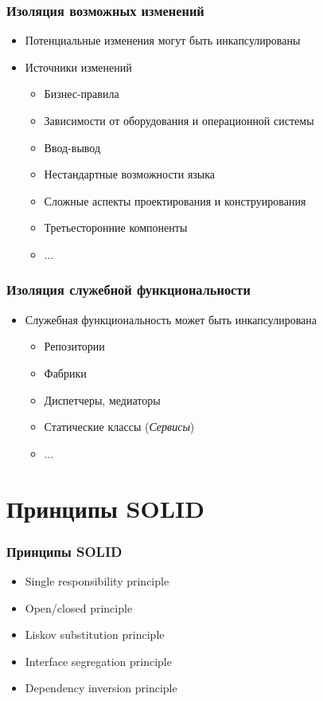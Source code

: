 \documentclass{../cscslides}
\begin{document}
    \begin{frame}
        \frametitle{Изоляция возможных изменений}
        \begin{itemize}
            \item Потенциальные изменения могут быть инкапсулированы
            \item Источники изменений
            \begin{itemize}
                \item Бизнес-правила
                \item Зависимости от оборудования и операционной системы
                \item Ввод-вывод
                \item Нестандартные возможности языка
                \item Сложные аспекты проектирования и конструирования
                \item Третьесторонние компоненты
                \item ...
            \end{itemize}
        \end{itemize}
    \end{frame}

    \begin{frame}
        \frametitle{Изоляция служебной функциональности}
        \begin{itemize}
            \item Служебная функциональность может быть инкапсулирована
            \begin{itemize}
                \item Репозитории
                \item Фабрики
                \item Диспетчеры, медиаторы
                \item Статические классы (\textit{Сервисы})
                \item ...
            \end{itemize}
        \end{itemize}
    \end{frame}

    \section{Принципы SOLID}
    
    \begin{frame}
        \frametitle{Принципы SOLID}
        \begin{itemize}
            \item Single responsibility principle
            \item Open/closed principle
            \item Liskov substitution principle
            \item Interface segregation principle
            \item Dependency inversion principle
        \end{itemize}
    \end{frame}
\end{document}
